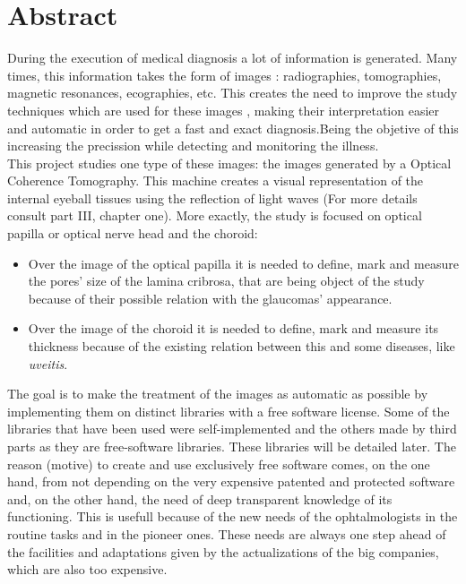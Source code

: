 \newpage

\section*{Abstract}
During the execution of medical diagnosis a lot of information is generated.
Many times, this information takes the form of images
\emph{\citep*[1. The Analysis of Medical Images, 2. Digital Image
  Acquisition]{toennies2012guide}}: radiographies, tomographies,
magnetic resonances, ecographies, etc.
This creates the need to improve the study techniques which are used
for these images \emph{\citep*[4. Image Enhancement]{toennies2012guide}},
making their interpretation easier and automatic in order to
get a fast and exact diagnosis.Being the objetive of this increasing the 
precission while detecting and monitoring the illness.\\
This project studies one type of these images: the images generated
by a Optical Coherence Tomography. This machine creates a visual
representation of the internal eyeball tissues using the reflection of 
light waves (For more details consult part III, chapter one). More
exactly, the study is focused on optical papilla or optical nerve head
and the choroid:
\begin{itemize}
\item Over the image of the optical papilla it is needed to define, mark and measure
  the pores' size of the lamina cribrosa, that are being object of the
  study because of their possible relation with the \gls{glaucoma}s' 
  appearance.
\item Over the image of the choroid it is needed to define, mark and measure its
  thickness because of the existing relation between this and some diseases,
  like \emph{\gls{uveitis}}.
\end{itemize}
The goal is to make the treatment of the images as automatic as possible 
by implementing them on distinct libraries with a free software
license. Some of the libraries that have been used were self-implemented and the others
made by third parts as they are free-software libraries. These
libraries will be detailed later. The reason (motive) to create and use exclusively
free software comes, on the one hand, from not depending on the very
expensive patented and protected software and, on the other hand,
the need of deep transparent knowledge of its functioning. This is
usefull because of the new needs of the ophtalmologists in the
routine tasks and in the pioneer ones. These needs are always one step
ahead of the facilities and adaptations given by the actualizations
of the big companies, which are also too expensive.